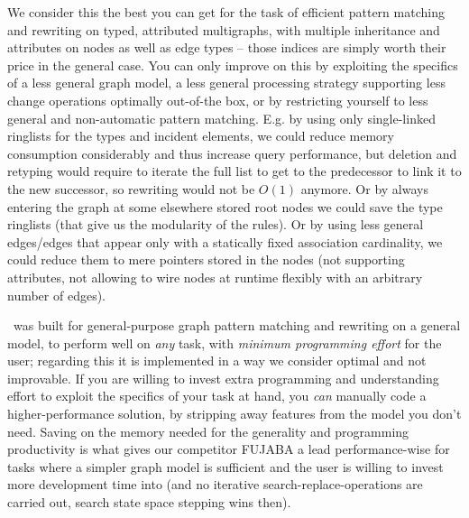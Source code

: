 We consider this the best you can get for the task of efficient pattern matching and rewriting on typed, attributed multigraphs, with multiple inheritance and attributes on nodes as well as edge types -- those indices are simply worth their price in the general case.
You can only improve on this by exploiting the specifics of a less general graph model, a less general processing strategy supporting less change operations optimally out-of-the box, or by restricting yourself to less general and non-automatic pattern matching.
E.g. by using only single-linked ringlists for the types and incident elements, we could reduce memory consumption considerably and thus increase query performance, but deletion and retyping would require to iterate the full list to get to the predecessor to link it to the new successor, so rewriting would not be $O(1)$ anymore.
Or by always entering the graph at some elsewhere stored root nodes we could save the type ringlists (that give us the modularity of the rules).
Or by using less general edges/edges that appear only with a statically fixed association cardinality, we could reduce them to mere pointers stored in the nodes (not supporting attributes, not allowing to wire nodes at runtime flexibly with an arbitrary number of edges).

\GrG\ was built for general-purpose graph pattern matching and rewriting on a general model, to perform well on \emph{any} task, with \emph{minimum programming effort} for the user; regarding this it is implemented in a way we consider optimal and not improvable.
If you are willing to invest extra programming and understanding effort to exploit the specifics of your task at hand, you \emph{can} manually code a higher-performance solution, by stripping away features from the model you don't need.
Saving on the memory needed for the generality and programming productivity is what gives our competitor FUJABA a lead performance-wise for tasks where a simpler graph model is sufficient and the user is willing to invest more development time into (and no iterative search-replace-operations are carried out, search state space stepping wins then).

